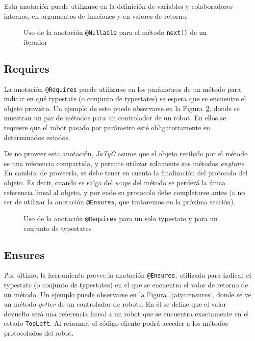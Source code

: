 Esta anotación puede utilizarse en la definición de variables y colaboradores internos, en argumentos de funciones y en valores de retorno.

\begin{figure}[htbp]
    \centering
    
    \caption{Uso de la anotación \texttt{@Nullable} para el método \texttt{next()} de un iterador}
    \label{jatyc:nullable}
\end{figure}

\subsection{Requires}

La anotación \texttt{@Requires} puede utilizarse en los parámetros de un método para indicar en qué typestate (o conjunto de typestates) se espera que se encuentre el objeto provisto. Un ejemplo de esto puede observarse en la Figura~\ref{jatyc:requires}, donde se muestran un par de métodos para un controlador de un robot. En ellos se requiere que el robot pasado por parámetro esté obligatoriamente en determinados estados.

De no proveer esta anotación, \textit{JaTyC} asume que el objeto recibido por el método es una referencia compartida, y permite utilizar solamente sus métodos \textit{anytime}. En cambio, de proveerla, se debe tener en cuenta la finalización del protocolo del objeto. Es decir, cuando se salga del \textit{scope} del método se perderá la única referencia lineal al objeto, y por ende su protocolo debe completarse antes (a no ser de utilizar la anotación \texttt{@Ensures}, que trataremos en la próxima sección).

\begin{figure}[htbp]
    \centering
    
    \caption{Uso de la anotación \texttt{@Requires} para un solo typestate y para un conjunto de typestates}
    \label{jatyc:requires}
\end{figure}

\subsection{Ensures}
\label{ensures}

Por último, la herramienta provee la anotación \texttt{@Ensures}, utilizada para indicar el typestate (o conjunto de typestates) en el que se encuentra el valor de retorno de un método. Un ejemplo puede observarse en la Figura~\ref{jatyc:ensures}, donde se ve un método \textit{getter} de un controlador de robots. En él se define que el valor devuelto será una referencia lineal a un robot que se encuentra exactamente en el estado \texttt{TopLeft}. Al retornar, el código cliente podrá acceder a los métodos protocolados del robot.

